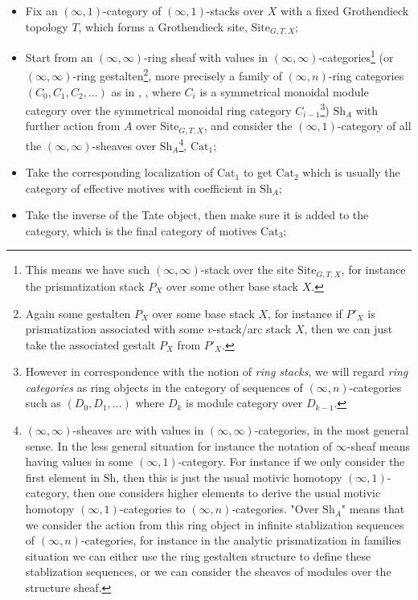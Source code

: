 \documentclass[12pt]{article}
\theoremstyle{definition}
\begin{document}
\begin{itemize}\setlength{\itemsep}{-0.1cm}
\item[1] Fix an $(\infty,1)$-category of $(\infty,1)$-stacks over $X$ with a fixed Grothendieck topology $T$, which forms a Grothendieck site, $\mathrm{Site}_{G,T,X}$;
\item[2] Start from an $(\infty,\infty)$-ring sheaf with values in $(\infty,\infty)$-categories\footnote{This means we have such $(\infty,\infty)$-stack over the site $\mathrm{Site}_{G,T,X}$, for instance the prismatization stack $P_X$ over some other base stack $X$.} (or $(\infty,\infty)$-ring gestalten\footnote{Again some gestalten $P_X$ over some base stack $X$, for instance if $P'_X$ is prismatization associated with some $v$-stack/arc stack $X$, then we can just take the associated gestalt $P_X$ from $P'_X$.}, more precisely a family of $(\infty,n)$-ring categories $(C_0,C_1,C_2,...)$ as in \cite{5S4}, \cite{5S5}, where $C_i$ is a symmetrical monoidal module category over the symmetrical monoidal ring category $C_{i-1}$\footnote{However in correspondence with the notion of \textit{ring stacks}, we will regard \textit{ring categories} as ring objects in the category of sequences of $(\infty,n)$-categories such as $(D_0,D_1,...)$ where $D_k$ is module category over $D_{k-1}$.}) $\mathrm{Sh}_A$ with further action from $A$ over $\mathrm{Site}_{G,T,X}$, and consider the $(\infty,1)$-category of all the $(\infty,\infty)$-sheaves over $\mathrm{Sh}_A$\footnote{$(\infty,\infty)$-sheaves are with values in $(\infty,\infty)$-categories, in the most general sense. In the less general situation for instance the notation of $\infty$-sheaf means having values in some $(\infty,1)$-category. For instance if we only consider the first element in $\mathrm{Sh}$, then this is just the usual motivic homotopy $(\infty,1)$-category, then one considers higher elements to derive the usual motivic homotopy $(\infty,1)$-categories to $(\infty, n)$-categories. "Over $\mathrm{Sh}_A$" means that we consider the action from this ring object in infinite stablization sequences of $(\infty,n)$-categories, for instance in the analytic prismatization in families situation we can either use the ring gestalten  structure to define these stablization sequences, or we can consider the sheaves of modules over the structure sheaf.}, $\mathrm{Cat}_1$;
\item[3] Take the corresponding localization of $\mathrm{Cat}_1$ to get $\mathrm{Cat}_2$ which is usually the category of effective motives with coefficient in $\mathrm{Sh}_A$;
\item[4] Take the inverse of the Tate object, then make sure it is added to the category, which is the final category of motives $\mathrm{Cat}_3$;

\end{itemize}
\end{document}
